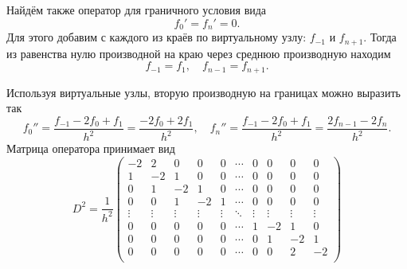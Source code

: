 \documentclass[a4paper,12pt]{article}
\begin{document}
	Найдём также оператор для граничного условия вида
	\[
		f_0' = f_n' = 0.
	\]
	Для этого добавим с каждого из краёв по виртуальному узлу: \( f_{-1} \) и \( f_{n+1} \). Тогда из равенства нулю производной на краю через среднюю производную находим
	\[
		f_{-1} = f_{1},\quad f_{n-1} = f_{n+1}.
	\]

	Используя виртуальные узлы, вторую производную на границах можно выразить так
	\[
		f_0'' = \frac{f_{-1} - 2 f_0 + f_1}{h^2} = \frac{-2f_0 + 2 f_1}{h^2}, \quad
		f_n'' = \frac{f_{-1} - 2 f_0 + f_1}{h^2} = \frac{2 f_{n-1}-2f_n}{h^2}.
	\]
	Матрица оператора принимает вид
	\[
		D^2 = \frac{1}{h^2}
		\begin{pmatrix}
			-2 & 2 &  0 &  0 & 0 & \cdots & 0 & 0 & 0 & 0 \\
			1 & -2 &  1 &  0 & 0 & \cdots & 0 & 0 & 0 & 0 \\
			0 &  1 & -2 &  1 & 0 & \cdots & 0 & 0 & 0 & 0 \\
			0 &  0 &  1 & -2 & 1 & \cdots & 0 & 0 & 0 & 0 \\
			\vdots&\vdots&\vdots&\vdots&\vdots&\ddots&\vdots&\vdots&\vdots&\vdots\\
			0 &  0 &  0 &  0 & 0 & \cdots &  1 & -2 &  1 & 0 \\
			0 &  0 &  0 &  0 & 0 & \cdots &  0 &  1 & -2 & 1 \\
			0 &  0 &  0 &  0 & 0 & \cdots &  0 &  0 &  2 & -2 \\
		\end{pmatrix}
	\]
\end{document}
